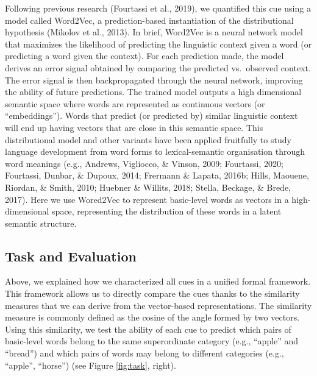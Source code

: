 \documentclass[english,,man]{apa6}
\begin{document}
Following previous research (Fourtassi et al., 2019), we quantified this cue using a model called Word2Vec, a prediction-based instantiation of the distributional hypothesis (Mikolov et al., 2013). In brief, Word2Vec is a neural network model that maximizes the likelihood of predicting the linguistic context given a word (or predicting a word given the context). For each prediction made, the model derives an error signal obtained by comparing the predicted vs.~observed context. The error signal is then backpropagated through the neural network, improving the ability of future predictions. The trained model outputs a high dimensional semantic space where words are represented as continuous vectors (or \enquote{embeddings}). Words that predict (or predicted by) similar linguistic context will end up having vectors that are close in this semantic space. This distributional model and other variants have been applied fruitfully to study language development from word forms to lexical-semantic organisation through word meanings (e.g., Andrews, Vigliocco, \& Vinson, 2009; Fourtassi, 2020; Fourtassi, Dunbar, \& Dupoux, 2014; Frermann \& Lapata, 2016b; Hills, Maouene, Riordan, \& Smith, 2010; Huebner \& Willits, 2018; Stella, Beckage, \& Brede, 2017). Here we use Wored2Vec to represent basic-level words as vectors in a high-dimensional space, representing the distribution of these words in a latent semantic structure.

\hypertarget{task-and-evaluation}{%
\subsection{Task and Evaluation}\label{task-and-evaluation}}

Above, we explained how we characterized all cues in a unified formal framework. This framework allows us to directly compare the cues thanks to the similarity measures that we can derive from the vector-based representations. The similarity measure is commonly defined as the cosine of the angle formed by two vectors. Using this similarity, we test the ability of each cue to predict which pairs of basic-level words belong to the same superordinate category (e.g., \enquote{apple} and \enquote{bread}) and which pairs of words may belong to different categories (e.g., \enquote{apple}, \enquote{horse}) (see Figure \ref{fig:task}, right).
\end{document}
